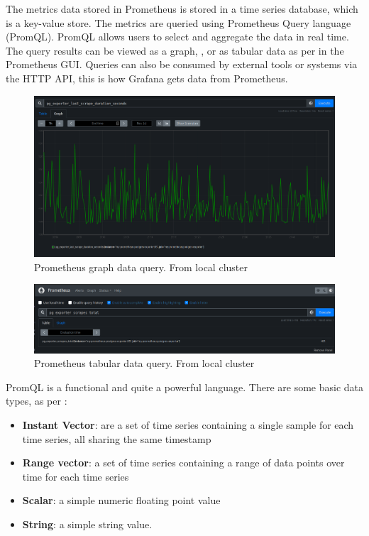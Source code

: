 The metrics data stored in Prometheus is stored in a time series database, which is a key-value store. The metrics are queried using Prometheus Query
language (PromQL). PromQL allows users to select and aggregate the data in real time. The query results can be viewed as a graph, , or as tabular
data as per  in the Prometheus GUI. Queries can also be consumed by external tools or systems via the HTTP API, this is how Grafana gets data from Prometheus.
\begin{figure}[H]
	\centering
	\includegraphics[width=1\linewidth]{figures/prom_query_graph.png}
	\caption{Prometheus graph data query. From local cluster}
	\label{fig:prom_query_graph}
\end{figure}
\begin{figure}[H]
	\centering
	\includegraphics[width=1\linewidth]{figures/prom_query_tabular.png}
	\caption{Prometheus tabular data query. From local cluster}
	\label{fig:prom_query_tabular}
\end{figure}
\bigbreak
PromQL is a functional and quite a powerful language. There are some basic data types, as per \autocite{prometheusQueryingBasicsPrometheus}:
\begin{itemize}
	\item \textbf{Instant Vector}: are a set of time series containing a single sample for each time series, all sharing the same timestamp
	\item \textbf{Range vector}: a set of time series containing a range of data points over time for each time series
	\item \textbf{Scalar}: a simple numeric floating point value
	\item \textbf{String}: a simple string value.
\end{itemize}
